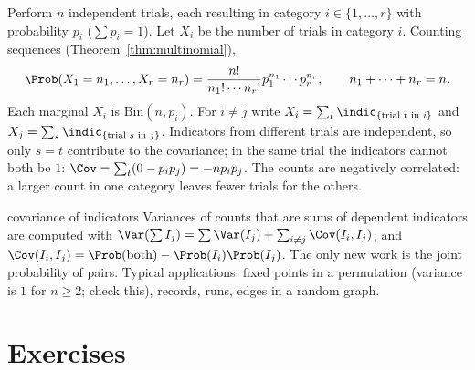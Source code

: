 \begin{example}\label{ex:multinomial}
Perform $n$ independent trials, each resulting in category $i\in\{1,\dots,r\}$ with
probability $p_i$ ($\sum p_i=1$). Let $X_i$ be the number of trials in category
$i$. Counting sequences (Theorem~\ref{thm:multinomial}),
\[
\Prob(X_1=n_1,\dots,X_r=n_r)=\frac{n!}{n_1!\cdots n_r!}p_1^{n_1}\cdots p_r^{n_r},
\qquad n_1+\dots+n_r=n .
\]
Each marginal $X_i$ is $\mathrm{Bin}(n,p_i)$. For $i\ne j$ write
$X_i=\sum_t\indic_{\{\text{trial }t\text{ in }i\}}$ and
$X_j=\sum_s\indic_{\{\text{trial }s\text{ in }j\}}$. Indicators from different
trials are independent, so only $s=t$ contribute to the covariance; in the same
trial the indicators cannot both be $1$:
$\Cov=\sum_t(0-p_ip_j)=-np_ip_j$. The counts are negatively correlated: a larger
count in one category leaves fewer trials for the others.
\end{example}

\begin{interview}{covariance of indicators}
Variances of counts that are sums of dependent indicators are computed with
$\Var(\sum I_j)=\sum\Var(I_j)+\sum_{i\ne j}\Cov(I_i,I_j)$, and
$\Cov(I_i,I_j)=\Prob(\text{both})-\Prob(I_i)\Prob(I_j)$. The only new work is the
joint probability of pairs. Typical applications: fixed points in a permutation
(variance is $1$ for $n\ge2$; check this), records, runs, edges in a random graph.
\end{interview}

\section*{Exercises}

